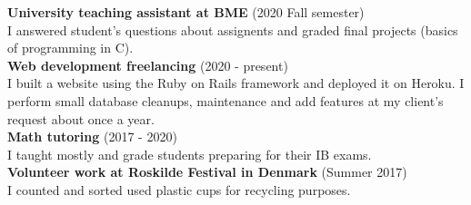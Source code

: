 \documentclass{article}
\begin{document}
\noindent
\textbf{University teaching assistant at BME} \hspace{3mm} \color{gray} (2020 Fall semester) \color{black} \\
I answered student's questions about assignents and graded final projects (basics of programming in C).
\smallskip \\

\noindent
\textbf{Web development freelancing} \hspace{3mm} \color{gray} (2020 - present) \color{black} \\
I built a website using the Ruby on Rails framework and deployed it on Heroku. I perform small database cleanups, maintenance and add features at my client's request about once a year.
\smallskip \\

\noindent
\textbf{Math tutoring} \hspace{3mm} \color{gray} (2017 - 2020) \color{black} \\
I taught mostly  and  grade students preparing for their IB exams.
\smallskip \\

\noindent
\textbf{Volunteer work at Roskilde Festival in Denmark} \color{gray} (Summer 2017) \color{black} \\
I counted and sorted used plastic cups for recycling purposes.
\vspace{5mm}
\end{document}
